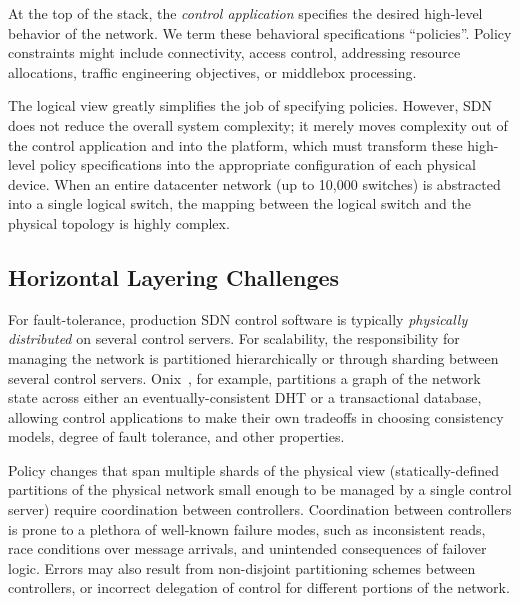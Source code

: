 At the top of the stack, the \emph{control application} specifies the desired
high-level behavior of the network. We term these behavioral specifications
``policies''. Policy constraints might include connectivity, access control,
addressing resource allocations, traffic engineering objectives, or middlebox
processing.

The logical view greatly simplifies the job of specifying policies. However, SDN
does not reduce the overall system complexity; it merely moves complexity out of
the control application and into the platform, which must transform these
high-level policy specifications into the appropriate configuration of each
physical device. When an entire datacenter network (up to 10,000 switches) is
abstracted into a single logical switch, the mapping between the logical switch
and the physical topology is highly complex.


\subsection{Horizontal Layering Challenges}

For fault-tolerance, production SDN control software is typically \emph{physically
distributed} on several control servers. For scalability, the responsibility for
managing the network is partitioned hierarchically or through sharding between
several control servers. Onix~\cite{onix}, for example, partitions a
graph of the network state across either an eventually-consistent DHT or a
transactional database, allowing control applications to make their own
tradeoffs in choosing consistency models, degree of fault tolerance, and other
properties.

Policy changes that span multiple shards of the physical view
(statically-defined partitions of the physical network small enough to be managed
by a single control server) require coordination between controllers.
Coordination between controllers is prone to a plethora of well-known failure
modes, such as inconsistent reads, race conditions over message arrivals, and
unintended consequences of failover logic. Errors may also result from
non-disjoint partitioning schemes between controllers, or incorrect delegation
of control for different portions of the network.

